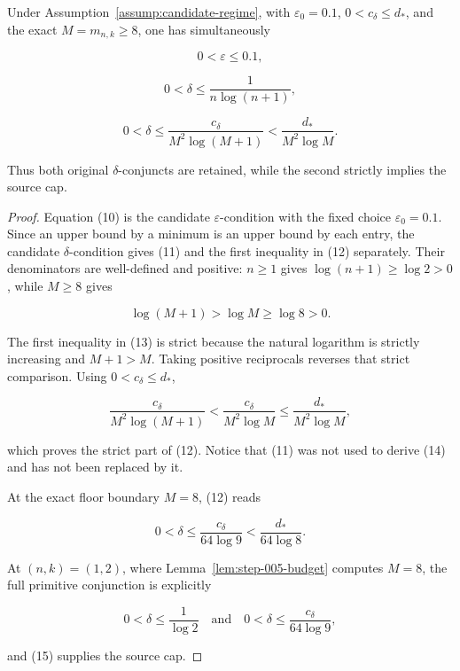 \begin{lemma}\label{lem:step-005-privacy-cap}
Under Assumption~\ref{assump:candidate-regime}, with
\(\varepsilon_0=0.1\), \(0<c_\delta\le d_*\), and the exact
\(M=m_{n,k}\ge8\), one has simultaneously

\[
0<\varepsilon\le0.1,
\tag{10}
\]

\[
0<\delta\le\frac{1}{n\log(n+1)},
\tag{11}
\]

\[
0<\delta\le\frac{c_\delta}{M^2\log(M+1)}
<\frac{d_*}{M^2\log M}.
\tag{12}
\]

Thus both original \(\delta\)-conjuncts are retained, while the second
strictly implies the source cap.
\end{lemma}

\begin{proof}
Equation (10) is the candidate \(\varepsilon\)-condition with the fixed
choice \(\varepsilon_0=0.1\). Since an upper bound by a minimum is an upper
bound by each entry, the candidate \(\delta\)-condition gives (11) and the
first inequality in (12) separately. Their denominators are well-defined
and positive: \(n\ge1\) gives \(\log(n+1)\ge\log2>0\), while \(M\ge8\)
gives

\[
\log(M+1)>\log M\ge\log8>0.
\tag{13}
\]

The first inequality in (13) is strict because the natural logarithm is
strictly increasing and \(M+1>M\). Taking positive reciprocals reverses
that strict comparison. Using \(0<c_\delta\le d_*\),

\[
\frac{c_\delta}{M^2\log(M+1)}
<\frac{c_\delta}{M^2\log M}
\le\frac{d_*}{M^2\log M},
\tag{14}
\]

which proves the strict part of (12). Notice that (11) was not used to
derive (14) and has not been replaced by it.

At the exact floor boundary \(M=8\), (12) reads

\[
0<\delta\le\frac{c_\delta}{64\log9}
<\frac{d_*}{64\log8}.
\tag{15}
\]

At \((n,k)=(1,2)\), where Lemma~\ref{lem:step-005-budget} computes
\(M=8\), the full primitive conjunction is explicitly

\[
0<\delta\le\frac1{\log2}
\quad\text{and}\quad
0<\delta\le\frac{c_\delta}{64\log9},
\]

and (15) supplies the source cap. \end{proof}

